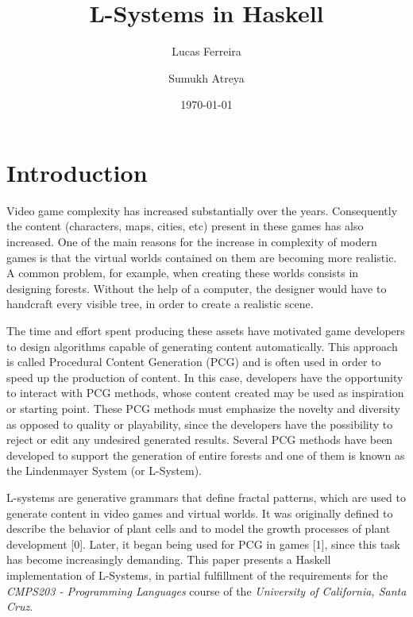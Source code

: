 \documentclass{article}
\title{L-Systems in Haskell}
\author[1]{Lucas Ferreira}
\author[1]{Sumukh Atreya}
\affil[1]{Department of Computer Science}
\affil[1]{University of California, Santa Cruz}
\date{\today}
\begin{document}
\maketitle


\section{Introduction}

Video game complexity has increased substantially over the years. Consequently the content
(characters, maps, cities, etc) present in these games has also increased.
One of the main reasons for the increase in complexity of modern games is that the
virtual worlds contained on them are becoming more realistic. A common problem, for example,
when creating these worlds consists in designing forests. Without the help of a computer, the designer would have to handcraft
every visible tree, in order to create a realistic scene.

The time and effort spent producing these assets have motivated game developers to design
algorithms capable of generating content automatically. This approach is called Procedural
Content Generation (PCG) and is often used in order to speed up the production
of content. In this case, developers have the opportunity to interact with PCG methods,
whose content created may be used as inspiration or starting point. These PCG methods must emphasize the novelty and diversity as opposed to quality or playability, since the developers
have the possibility to reject or edit any undesired generated results. Several PCG
methods have been developed to support the generation of entire forests and one of
them is known as the Lindenmayer System (or L-System).

L-systems are generative grammars that define fractal patterns, which are used to
generate content in video games and virtual worlds. It was originally defined
to describe the behavior of plant cells and to model the growth processes of plant development [0].
Later, it began being used for PCG in games [1], since this task has become increasingly demanding.
This paper presents a Haskell implementation of L-Systems, in partial fulfillment of the requirements for
the \textit{CMPS203 - Programming Languages} course of the \textit{University of California, Santa Cruz}.
\end{document}
